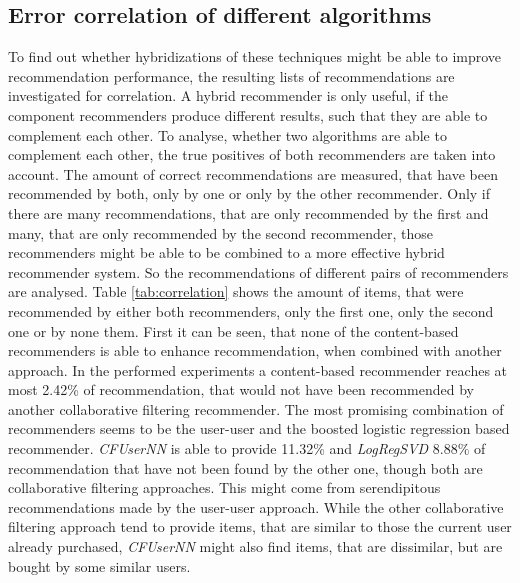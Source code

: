 \documentclass[10pt]{reportMaster}
\begin{document}

\subsection{Error correlation of different algorithms}
To find out whether hybridizations of these techniques might be able to improve recommendation performance, the resulting lists of recommendations are investigated for correlation.
A hybrid recommender is only useful, if the component recommenders produce different results, such that they are able to complement each other.
To analyse, whether two algorithms are able to complement each other, the true positives of both recommenders are taken into account.
The amount of correct recommendations are measured, that have been recommended by both, only by one or only by the other recommender.
Only if there are many recommendations, that are only recommended by the first and many, that are only recommended by the second recommender, those recommenders might be able to be combined to a more effective hybrid recommender system.
So the recommendations of different pairs of recommenders are analysed.
Table \ref{tab:correlation} shows the amount of items, that were recommended by either both recommenders, only the first one, only the second one or by none them.
First it can be seen, that none of the content-based recommenders is able to enhance recommendation, when combined with another approach.
In the performed experiments a content-based recommender reaches at most 2.42\% of recommendation, that would not have been recommended by another collaborative filtering recommender.
The most promising combination of recommenders seems to be the user-user and the boosted logistic regression based recommender.
\textit{CFUserNN} is able to provide 11.32\% and \textit{LogRegSVD} 8.88\% of recommendation that have not been found by the other one, though both are collaborative filtering approaches.
This might come from serendipitous recommendations made by the user-user approach.
While the other collaborative filtering approach tend to provide items, that are similar to those the current user already purchased, \textit{CFUserNN} might also find items, that are dissimilar, but are bought by some similar users.
\end{document}
